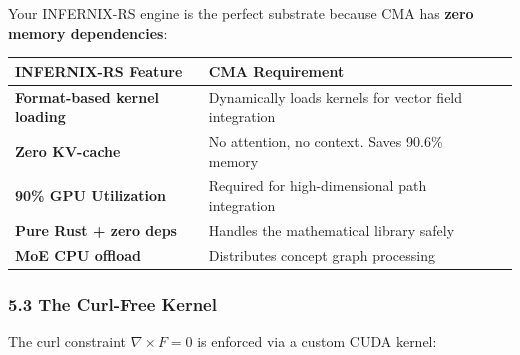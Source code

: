 \documentclass[
  11pt,
  a4paper,
]{article}
\begin{document}
Your INFERNIX-RS engine is the perfect substrate because CMA has
\textbf{zero memory dependencies}:

\begin{longtable}[]{@{}
  >{\raggedright\arraybackslash}p{}
  >{\raggedright\arraybackslash}p{}
  >{\raggedright\arraybackslash}p{}@{}}
\toprule\noalign{}
\begin{minipage}[b]{\linewidth}\raggedright
INFERNIX-RS Feature
\end{minipage} & \begin{minipage}[b]{\linewidth}\raggedright
CMA Requirement
\end{minipage} & \begin{minipage}[b]{\linewidth}\raggedright
\end{minipage} \\
\midrule\noalign{}
\endhead
\bottomrule\noalign{}
\endlastfoot
\textbf{Format-based kernel loading} & Dynamically loads kernels for
vector field integration & \\
\textbf{Zero KV-cache} & No attention, no context. Saves 90.6\% memory
& \\
\textbf{90\% GPU Utilization} & Required for high-dimensional path
integration & \\
\textbf{Pure Rust + zero deps} & Handles the mathematical library safely
& \\
\textbf{MoE CPU offload} & Distributes concept graph processing & \\
\end{longtable}

\subsubsection{5.3 The Curl-Free Kernel}\label{the-curl-free-kernel}

The curl constraint \(\nabla \times F = 0\) is enforced via a custom
CUDA kernel:
\end{document}
